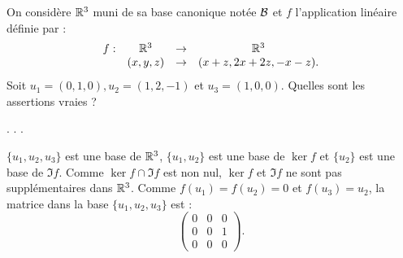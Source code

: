 \begin{question}
On considère $\mathbb{R}^3$ muni de sa base canonique notée ${\cal {B}}$ et 
$f$ l'application linéaire définie  par : 
$$\begin{array}{rccc}f:&\mathbb{R}^3 &\to& \mathbb{R}^3\\
& (x,y,z)&\to &(x+z,2x+2z,-x-z).  \end{array}$$
Soit $ u_1=(0,1,0), u_2=(1,2,-1)$ et $ u_3=(1,0,0)$.  
Quelles sont les assertions vraies ?
\begin{answers} 
.
.
.
\end{answers}
\begin{explanations} $\{u_1,u_2,u_3\}$ est une base de $\mathbb{R}^3$,  
$\{u_1 , u_2\}$  est une base de $\ker f$ et  $\{u_2\}$  est une base de $\Im f$. Comme $ \ker f \cap \Im f$ est non nul, $\ker f $ et $\Im f$ ne sont pas supplémentaires dans $\mathbb{R}^3$. Comme $f(u_1)=f(u_2)=0$ et $f(u_3)=u_2$, la matrice dans la base
$\{u_1,u_2,u_3\}$ est : 
$$\left(\begin{array}{rcc}
0&0&0\\
0&0&1\\ 
0&0&0\end{array}\right).$$
\end{explanations}
\end{question}

